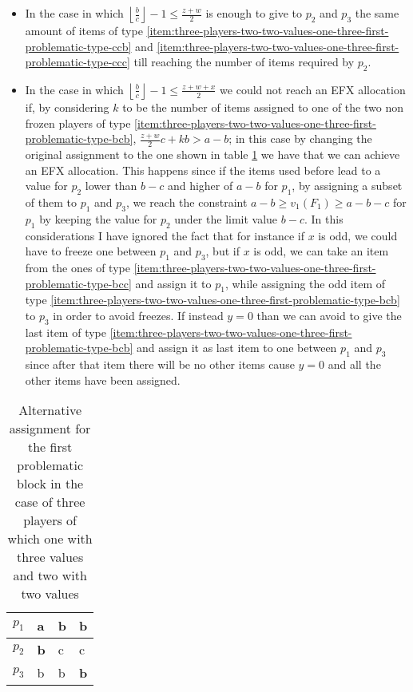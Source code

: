 \documentclass{article}
\begin{document}
\begin{itemize}
    \item In the case in which $\left\lfloor \frac{b}{c}\right\rfloor-1 \le \frac{z+w}{2}$ is enough to give to $p_2$ and $p_3$ the same amount of items of type \ref{item:three-players-two-two-values-one-three-first-problematic-type-ccb} and \ref{item:three-players-two-two-values-one-three-first-problematic-type-ccc} till reaching the number of items required by $p_2$.
    
    \item In the case in which $\left\lfloor \frac{b}{c}\right\rfloor-1 \le \frac{z+w+x}{2}$ we could not reach an EFX allocation if, by considering $k$ to be the number of items assigned to one of the two non frozen players of type \ref{item:three-players-two-two-values-one-three-first-problematic-type-bcb}, $\frac{z+w}{2}c + kb > a-b$; in this case by changing the original assignment to the one shown in table \ref{table:three-players-two-two-values-one-three-first-problematic-invert-assignment-first-problematic} we have that we can achieve an EFX allocation. This happens since if the items used before lead to a value for $p_2$ lower than $b-c$ and higher of $a-b$ for $p_1$, by assigning a subset of them to $p_1$ and $p_3$, we reach the constraint $a-b\ge v_1(F_1)\ge a-b-c$ for $p_1$ by keeping the value for $p_2$ under the limit value $b-c$. In this considerations I have ignored the fact that for instance if $x$ is odd, we could have to freeze one between $p_1$ and $p_3$, but if $x$ is odd, we can take an item from the ones of type \ref{item:three-players-two-two-values-one-three-first-problematic-type-bcc} and assign it to $p_1$, while assigning the odd item of type \ref{item:three-players-two-two-values-one-three-first-problematic-type-bcb} to $p_3$ in order to avoid freezes. If instead $y=0$ than we can avoid to give the last item of type \ref{item:three-players-two-two-values-one-three-first-problematic-type-bcb} and assign it as last item to one between $p_1$ and $p_3$ since after that item there will be no other items cause $y=0$ and all the other items have been assigned.
\end{itemize}

\begin{table}[h]
    \centering
    \begin{tabular}{|l|l|l|l|}
    \hline
    $p_1$ & a & \textbf{b} & b \\ \hline
    $p_2$ & \textbf{b} & c & c \\ \hline
    $p_3$ & b & b & \textbf{b} \\ \hline
    \end{tabular}
    \caption{Alternative assignment for the first problematic block in the case of three players of which one with three values and two with two values}
    \label{table:three-players-two-two-values-one-three-first-problematic-invert-assignment-first-problematic}
\end{table}
\end{document}
